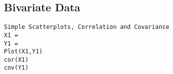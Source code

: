 \subsection{Bivariate Data}
\begin{verbatim}
Simple Scatterplots, Correlation and Covariance
X1 =
Y1 =
Plot(X1,Y1)
cor(X1)
cov(Y1)
\end{verbatim}

